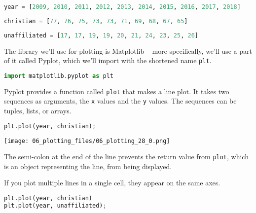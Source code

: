 \begin{lstlisting}[language=Python,style=source]
year = [2009, 2010, 2011, 2012, 2013, 2014, 2015, 2016, 2017, 2018]
\end{lstlisting}

\begin{lstlisting}[language=Python,style=source]
christian = [77, 76, 75, 73, 73, 71, 69, 68, 67, 65]
\end{lstlisting}

\begin{lstlisting}[language=Python,style=source]
unaffiliated = [17, 17, 19, 19, 20, 21, 24, 23, 25, 26]
\end{lstlisting}

The library we'll use for plotting is Matplotlib -- more specifically,
we'll use a part of it called Pyplot, which we'll import with the
shortened name \passthrough{\lstinline!plt!}.

\begin{lstlisting}[language=Python,style=source]
import matplotlib.pyplot as plt
\end{lstlisting}

Pyplot provides a function called \passthrough{\lstinline!plot!} that
makes a line plot. It takes two sequences as arguments, the
\passthrough{\lstinline!x!} values and the \passthrough{\lstinline!y!}
values. The sequences can be tuples, lists, or arrays.

\begin{lstlisting}[language=Python,style=source]
plt.plot(year, christian);
\end{lstlisting}

\begin{center}
\texttt{[image: 06\_plotting\_files/06\_plotting\_28\_0.png]}
\end{center}

The semi-colon at the end of the line prevents the return value from
\passthrough{\lstinline!plot!}, which is an object representing the
line, from being displayed.

\pagebreak

If you plot multiple lines in a single cell, they appear on the same
axes.

\begin{lstlisting}[language=Python,style=source]
plt.plot(year, christian)
plt.plot(year, unaffiliated);
\end{lstlisting}

